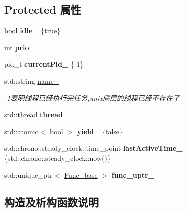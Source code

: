 \subsection*{Protected 属性}
\begin{DoxyCompactItemize}
\item 
\mbox{\label{classThread_a23541f34356cb161bb5fe6026bb3000a}} 
bool {\bfseries idle\+\_\+} \{true\}
\item 
\mbox{\label{classThread_ada8c342b34fb001cfcf57619b7150840}} 
int {\bfseries prio\+\_\+}
\item 
\mbox{\label{classThread_a0c0878a96696bbb092a69bc2f1f812fd}} 
pid\+\_\+t {\bfseries current\+Pid\+\_\+} \{-\/1\}
\item 
\mbox{\label{classThread_aa222eb32e5fc8f386d9fb018607acd9c}} 
std\+::string \hyperlink{classThread_aa222eb32e5fc8f386d9fb018607acd9c}{name\+\_\+}
\begin{DoxyCompactList}\small\item\em -\/1表明线程已经执行完任务,unix底层的线程已经不存在了 \end{DoxyCompactList}\item 
\mbox{\label{classThread_ad313ba812a7875c743dd0d37d565acfb}} 
std\+::thread {\bfseries thread\+\_\+}
\item 
\mbox{\label{classThread_ae8ebc3f208496db3052de7a56eb6e895}} 
std\+::atomic$<$ bool $>$ {\bfseries yield\+\_\+} \{false\}
\item 
\mbox{\label{classThread_ae7ed71c6b1f7782ecd4186005fd70760}} 
std\+::chrono\+::steady\+\_\+clock\+::time\+\_\+point {\bfseries last\+Active\+Time\+\_\+} \{std\+::chrono\+::steady\+\_\+clock\+::now()\}
\item 
\mbox{\label{classThread_a677202a7d90ebc5a6d4f8b1eab1a1eac}} 
std\+::unique\+\_\+ptr$<$ \hyperlink{structThread_1_1Func__base}{Func\+\_\+base} $>$ {\bfseries func\+\_\+uptr\+\_\+}
\end{DoxyCompactItemize}


\subsection{构造及析构函数说明}
\mbox{\label{classThread_a2375aeb8a227668652d593b180bac64e}} 
